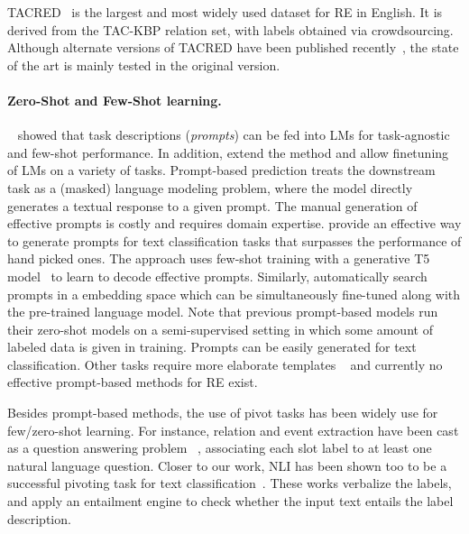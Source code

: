 \documentclass[11pt]{article}
\begin{document}
TACRED~\cite{zhang2017tacred} is the largest and most widely used dataset for RE in English. It is derived from the TAC-KBP relation set, with labels  obtained via crowdsourcing. Although alternate versions of TACRED have been published recently~\cite{alt-etal-2020-tacred, retacred}, the state of the art is mainly tested in the original version. 





\paragraph{Zero-Shot and Few-Shot learning.} ~\citet{brown2020language} showed that task descriptions (\emph{prompts}) can be fed into LMs for task-agnostic and few-shot performance. In addition, \cite{schick2020small, schick-schutze-2021-exploiting, tam2021AdaPET} extend the method and allow finetuning of LMs on a variety of tasks. 
Prompt-based prediction treats the downstream task as a (masked) language modeling problem, where the model directly generates a textual response to a given  prompt. 
The manual generation of effective prompts is costly and requires domain expertise. \citet{gao2020making} provide an effective way to generate prompts for text classification tasks that surpasses the performance of hand picked ones. The approach uses few-shot training with a generative T5 model~\cite{JMLR:v21:20-074} to learn to decode effective prompts. 
Similarly,  \citet{liu2021gpt} automatically search prompts in a embedding space which can be simultaneously fine-tuned along with the pre-trained language model. Note that previous prompt-based models run their zero-shot models on a semi-supervised setting in which some amount of labeled data is given in training. 
Prompts can be easily generated for text classification. Other tasks require more elaborate templates ~\cite{goswami-etal-2020-unsupervised,li2021documentlevel} and currently no effective prompt-based methods for RE exist.



Besides prompt-based methods, the use of pivot tasks has been widely use for few/zero-shot learning. For instance, relation and event extraction have been cast as a question answering problem ~\cite{levy-etal-2017-zero,du-cardie-2020-event}, associating each slot label to at least one natural language question. Closer to our work, NLI has been shown too to be a successful pivoting task for text classification~\cite{yin-etal-2019-benchmarking, yin-etal-2020-universal, facebook_entailment, sainz-rigau-2021-ask2transformers}. These works verbalize the labels, and apply an entailment engine to check whether the input text entails the label description. 
\end{document}
